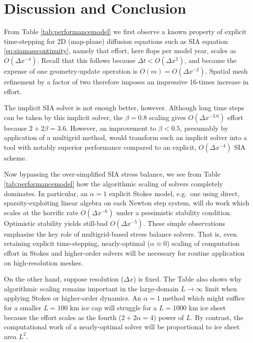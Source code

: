 \documentclass[review,letterpaper]{igs}
\begin{document}


\section{Discussion and Conclusion}

From Table \ref{tab:performancemodel} we first observe a known property of explicit time-stepping for 2D (map-plane) diffusion equations such as SIA equation \eqref{eq:siamasscontinuity}, namely that effort, here flops per model year, scales as $O(\Delta x^{-4})$.  Recall that this follows because $\Delta t < O(\Delta x^2)$, and because the expense of one geometry-update operation is $O(m) = O(\Delta x^{-2})$.  Spatial mesh refinement by a factor of two therefore imposes an impressive 16-times increase in effort.

The \cite{Bueler2016} implicit SIA solver is not enough better, however.  Although long time steps can be taken by this implicit solver, the $\beta=0.8$ scaling gives $O(\Delta x^{-3.6})$ effort because $2+2\beta=3.6$.  However, an improvement to $\beta < 0.5$, presumably by application of a multigrid method, would transform such an implicit solver into a tool with notably superior performance compared to an explicit, $O(\Delta x^{-4})$ SIA scheme.

Now bypassing the over-simplified SIA stress balance, we see from Table \ref{tab:performancemodel} how the algorithmic scaling of solvers completely dominates.  In particular, an $\alpha=1$ explicit Stokes model, e.g.~one using direct, sparsity-exploiting linear algebra on each Newton step system, will do work which scales at the horrific rate $O(\Delta x^{-6})$ under a pessimistic stability condition.  Optimistic stability yields still-bad $O(\Delta x^{-5})$.  These simple observations emphasize the key role of multigrid-based stress balance solvers.  That is, even retaining explicit time-stepping, nearly-optimal ($\alpha \approx 0$) scaling of computation effort in Stokes and higher-order solvers will be necessary for routine application on high-resolution meshes.

On the other hand, suppose resolution ($\Delta x$) is fixed.  The Table also shows why algorithmic scaling remains important in the large-domain $L\to\infty$ limit when applying Stokes or higher-order dynamics.  An $\alpha=1$ method which might suffice for a smaller $L=100$ km ice cap will struggle for a $L=1000$ km ice sheet because the effort scales as the fourth ($2+2\alpha=4$) power of $L$.  By contrast, the computational work of a nearly-optimal solver will be proportional to ice sheet area $L^2$.
\end{document}
